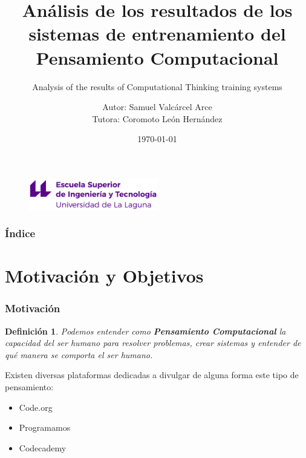 \documentclass{beamer}
\title[Defensa Oral TFG]{Análisis de los resultados de los sistemas de entrenamiento del Pensamiento Computacional}
\subtitle{Analysis of the results of Computational Thinking training systems}
\author[Samuel Valcárcel Arce]{Autor: Samuel Valcárcel Arce \\ Tutora: Coromoto León Hernández}
\institute[ULL]{Universidad de La Laguna}
\date[\today]{\today}
\newtheorem{definicion}{Definición}
\begin{document}
  
\begin{frame}
  \begin{figure}
  \includegraphics[width=0.5\textwidth]{img/logo_nuevo.eps}
  \end{figure}
  \hspace*{7.5cm}
  \titlepage

\end{frame}

\begin{frame}
  \frametitle{Índice}  
  \tableofcontents[pausesections]
\end{frame}


\section{Motivación y Objetivos}


\begin{frame}

\frametitle{Motivación}

\begin{definicion}
    Podemos entender como \textbf{Pensamiento Computacional} la capacidad del ser humano para resolver problemas, crear sistemas y entender de qué manera se comporta 
    el ser humano.
\end{definicion}

Existen diversas plataformas dedicadas a divulgar de alguna forma este tipo de pensamiento:
\begin{itemize}
    \item Code.org
    \item Programamos
    \item Codecademy
\end{itemize}

\end{frame}
\end{document}
